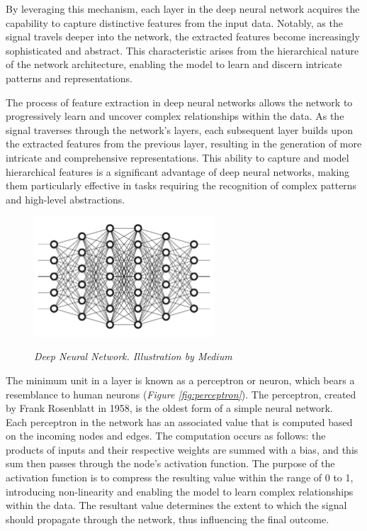 By leveraging this mechanism, each layer in the deep neural network acquires
the capability to capture distinctive features from the input data. Notably, as
the signal travels deeper into the network, the extracted features become
increasingly sophisticated and abstract. This characteristic arises from the
hierarchical nature of the network architecture, enabling the model to learn
and discern intricate patterns and representations. \newline

The process of feature extraction in deep neural networks allows the network to
progressively learn and uncover complex relationships within the data. As the
signal traverses through the network's layers, each subsequent layer builds
upon the extracted features from the previous layer, resulting in the
generation of more intricate and comprehensive representations. This ability to
capture and model hierarchical features is a significant advantage of deep
neural networks, making them particularly effective in tasks requiring the
recognition of complex patterns and high-level abstractions.

\begin{figure}[H]
  \centering
  \includegraphics[width=0.6\textwidth]{imatges/preliminaries/deepnn.jpg}
  \caption[Deep Neural Network] {\textit{Deep Neural Network.
  Illustration by Medium}}
  {\label{fig:deep-nn}}
\end{figure}

The minimum unit in a layer is known as a perceptron or neuron, which bears a
resemblance to human neurons (\textit{Figure \ref{fig:perceptron}}). The
perceptron, created by Frank Rosenblatt in 1958, is the oldest form of a simple
neural network. \\

Each perceptron in the network has an associated value that is computed based
on the incoming nodes and edges. The computation occurs as follows: the
products of inputs and their respective weights are summed with a bias, and
this sum then passes through the node's activation function. The purpose of the
activation function is to compress the resulting value within the range of 0 to
1, introducing non-linearity and enabling the model to learn complex
relationships within the data. The resultant value determines the extent to
which the signal should propagate through the network, thus influencing the
final outcome.


